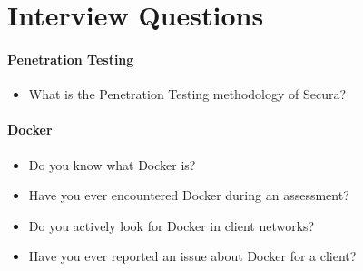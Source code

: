 \chapter{Interview Questions}\label{appendix:b}

\subsubsection{Penetration Testing}
\begin{itemize}
    \item What is the Penetration Testing methodology of Secura?
\end{itemize}


\subsubsection{Docker}
\begin{itemize}
    \item Do you know what Docker is?
    \item Have you ever encountered Docker during an assessment?
    \item Do you actively look for Docker in client networks?
    \item Have you ever reported an issue about Docker for a client?
\end{itemize}
